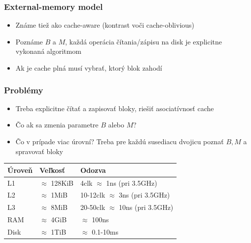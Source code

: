 \documentclass{beamer}
\begin{document}
\begin{frame}
	\frametitle{External-memory model}
	\begin{itemize}
		\item Známe tiež ako cache-aware (kontrast voči cache-oblivious)
		\item Poznáme $B$ a $M$, každá operácia čítania/zápisu na disk je explicitne vykonaná algoritmom
		\item Ak je cache plná musí vybrať, ktorý blok zahodí
	\end{itemize}
\end{frame}

\begin{frame}
	\frametitle{Problémy}
	\begin{itemize}
		\item Treba explicitne čítať a zapisovať bloky, riešiť asociatívnosť cache
		\item Čo ak sa zmenia parametre $B$ alebo $M$?
		\item Čo v prípade viac úrovní? Treba pre každú susediacu dvojicu poznať $B, M$  a spravovať bloky
	\end{itemize}
	\pause
	\begin{center}
		\begin{tabular}{|l|l|l|}
			\hline
			Úroveň & Veľkosť & Odozva \\ \hline
			L1 & $\approx$ 128KiB & 4clk $\approx$ 1ns (pri 3.5GHz) \\ \hline
			L2 & $\approx$ 1MiB & 10-12clk $\approx$ 3ns (pri 3.5GHz) \\ \hline
			L3 & $\approx$ 8MiB & 20-50clk $\approx$ 10ns (pri 3.5GHz) \\ \hline
			RAM & $\approx$ 4GiB & $\approx$ 100ns \\ \hline
			Disk & $\approx$ 1TiB & $\approx$ 0.1-10ms \\
			\hline
		\end{tabular}
	\end{center}
\end{frame}
\end{document}
